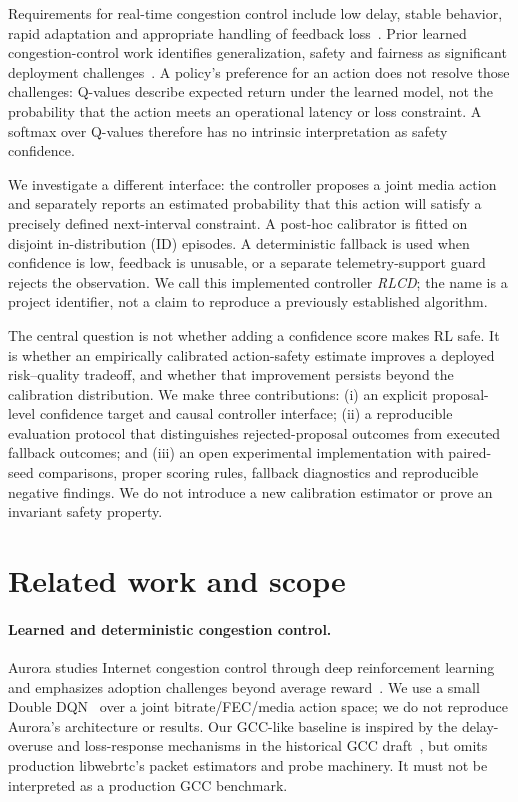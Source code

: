 \documentclass[10pt]{article}
\begin{document}
Requirements for real-time congestion control include low delay, stable behavior, rapid adaptation and appropriate handling of feedback loss~\cite{rfc8836}. Prior learned congestion-control work identifies generalization, safety and fairness as significant deployment challenges~\cite{jay2019aurora}. A policy's preference for an action does not resolve those challenges: Q-values describe expected return under the learned model, not the probability that the action meets an operational latency or loss constraint. A softmax over Q-values therefore has no intrinsic interpretation as safety confidence.

We investigate a different interface: the controller proposes a joint media action and separately reports an estimated probability that this action will satisfy a precisely defined next-interval constraint. A post-hoc calibrator is fitted on disjoint in-distribution (ID) episodes. A deterministic fallback is used when confidence is low, feedback is unusable, or a separate telemetry-support guard rejects the observation. We call this implemented controller \emph{RLCD}; the name is a project identifier, not a claim to reproduce a previously established algorithm.

The central question is not whether adding a confidence score makes RL safe. It is whether an empirically calibrated action-safety estimate improves a deployed risk--quality tradeoff, and whether that improvement persists beyond the calibration distribution. We make three contributions: (i) an explicit proposal-level confidence target and causal controller interface; (ii) a reproducible evaluation protocol that distinguishes rejected-proposal outcomes from executed fallback outcomes; and (iii) an open experimental implementation with paired-seed comparisons, proper scoring rules, fallback diagnostics and reproducible negative findings. We do not introduce a new calibration estimator or prove an invariant safety property.

\section{Related work and scope}
\paragraph{Learned and deterministic congestion control.}
Aurora studies Internet congestion control through deep reinforcement learning and emphasizes adoption challenges beyond average reward~\cite{jay2019aurora}. We use a small Double DQN~\cite{hasselt2016double} over a joint bitrate/FEC/media action space; we do not reproduce Aurora's architecture or results. Our GCC-like baseline is inspired by the delay-overuse and loss-response mechanisms in the historical GCC draft~\cite{holmer2016gcc}, but omits production libwebrtc's packet estimators and probe machinery. It must not be interpreted as a production GCC benchmark.
\end{document}
